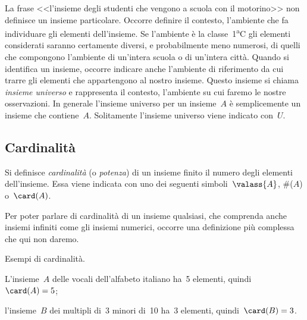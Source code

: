 La frase <<l'insieme degli studenti che vengono a scuola con il motorino>> non definisce un
insieme particolare. Occorre definire il contesto, l'ambiente che fa individuare gli elementi
dell'insieme. Se l'ambiente è la classe~1\textsuperscript{a}C gli elementi considerati saranno certamente diversi, e probabilmente meno numerosi, di quelli che compongono l'ambiente di un'intera scuola o di un'intera
città. Quando si identifica un insieme, occorre indicare anche l'ambiente di riferimento da cui trarre gli elementi che appartengono al nostro insieme. Questo insieme si chiama \emph{insieme universo} e rappresenta il contesto, l'ambiente su cui faremo le nostre osservazioni. In generale l'insieme universo per un insieme~$A$ è semplicemente un insieme che contiene~$A$. Solitamente l'insieme universo viene indicato con~$U$.

\subsection{Cardinalità}

\begin{definizione}
 Si definisce \emph{cardinalità} (o \emph{potenza}) di un insieme finito il numero
degli elementi dell'insieme. Essa viene indicata con uno dei seguenti simboli~$\valass{A}$, \#($A$) o~$\card(A)$.
\end{definizione}

Per poter parlare di cardinalità di un insieme qualsiasi, che
comprenda anche insiemi infiniti come gli insiemi numerici, occorre una
definizione più complessa che qui non daremo.

\begin{exrig}
 \begin{esempio}
 Esempi di cardinalità.
 \begin{enumeratea}
  \item L'insieme~$A$ delle vocali dell'alfabeto italiano ha~5 elementi, quindi~$\card(A)=5$;
  \item l'insieme~$B$ dei multipli di~3 minori di~10 ha~3 elementi, quindi~$\card(B)=3$.
 \end{enumeratea}
 \end{esempio}
\end{exrig}

\ovalbox{\risolvii \ref{ese:5.9}, \ref{ese:5.10}, \ref{ese:5.11}, \ref{ese:5.12}, \ref{ese:5.13}, \ref{ese:5.14}}

\newpage

\cleardoublepage
